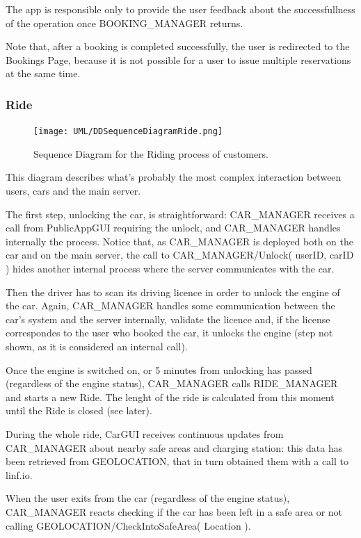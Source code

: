 \documentclass[11pt]{article} %
\begin{document}
The app is responsible only to provide the user feedback about the successfullness of the operation once BOOKING\_MANAGER returns.

Note that, after a booking is completed successfully, the user is redirected to the Bookings Page, because it is not possible for a user to issue multiple reservations at the same time.


\subsubsection{Ride}
\begin{figure}[H]
	\centering
	\texttt{[image: UML/DDSequenceDiagramRide.png]}
	\caption{Sequence Diagram for the Riding process of customers.}
\end{figure}

This diagram describes what's probably the most complex interaction between users, cars and the main server.

The first step, unlocking the car, is straightforward: CAR\_MANAGER receives a call from PublicAppGUI requiring the unlock, and CAR\_MANAGER handles internally the process. Notice that, as CAR\_MANAGER is deployed both on the car and on the main server, the call to CAR\_MANAGER/Unlock( userID, carID ) hides another internal process where the server communicates with the car.

Then the driver has to scan its driving licence in order to unlock the engine of the car. Again, CAR\_MANAGER handles some communication between the car's system and the server internally, validate the licence and, if the license correspondes to the user who booked the car, it unlocks the engine (step not shown, as it is considered an internal call).

Once the engine is switched on, or 5 minutes from unlocking has passed (regardless of the engine status), CAR\_MANAGER calls RIDE\_MANAGER and starts a new Ride. The lenght of the ride is calculated from this moment until the Ride is closed (see later).

During the whole ride, CarGUI receives continuous updates from CAR\_MANAGER about nearby safe areas and charging station: this data has been retrieved from GEOLOCATION, that in turn obtained them with a call to linf.io.

When the user exits from the car (regardless of the engine status), CAR\_MANAGER reacts checking if the car has been left in a safe area or not calling GEOLOCATION/CheckIntoSafeArea( Location ).
\end{document}

